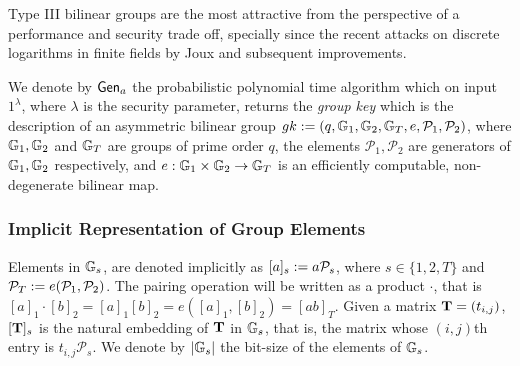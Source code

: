 Type III bilinear groups are the most attractive from the perspective
of a performance and security trade off, specially since the recent attacks on discrete logarithms in
finite fields by Joux \cite{SAC:Joux13} and subsequent improvements.

We denote by $\mathsf{Gen}_a$ the probabilistic polynomial time algorithm which on input $1^{\lambda}$, where $\lambda$ is the security parameter, returns the \emph{group key} which is the description of an asymmetric bilinear group $gk:=(q,\mathbb{G}_1,\mathbb{G}_2,\mathbb{G}_T,e,\mathcal{P}_1,\mathcal{P}_2)$, where $\mathbb{G}_1,\mathbb{G}_2$
and $\mathbb{G}_T$ are groups of prime order $q$, the elements $\mathcal{P}_1, \mathcal{P}_2$ are generators of 
$\mathbb{G}_1,\mathbb{G}_2$ respectively, and $e:\mathbb{G}_1\times\mathbb{G}_2\to\mathbb{G}_T$ is an efficiently
computable, non-degenerate bilinear map. 

\subsubsection{Implicit Representation of Group Elements}

Elements in $\mathbb{G}_s$, are denoted implicitly as $[a]_s:=a \mathcal{P}_s$, where $s \in \{1,2,T\}$ and $\mathcal{P}_T:=e(\mathcal{P}_1,\mathcal{P}_2)$. 
The pairing operation will be written as a product $\cdot$, that is $[a]_1 \cdot [b]_2=[a]_1 [b]_2=e([a]_1,[b]_2)=[ab]_T$. Given a matrix $\mathbf{{T}}=(t_{i,j})$, $[\mathbf{{T}}]_s$ is
the natural embedding of $\mathbf{{T}}$ in $\mathbb{G}_s$, that is, the matrix whose $(i,j)$th entry
is $t_{i,j}\mathcal{P}_s$. We denote by $|\mathbb{G}_s|$ the bit-size of the elements of $\mathbb{G}_s$.

